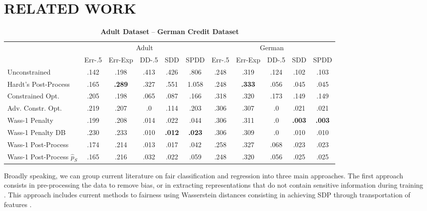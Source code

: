 \documentclass[letterpaper]{article}
\newcommand\boldblue[1]{\textcolor{lowblue}{\textbf{#1}}}
\newcommand\boldred[1]{\textcolor{lowred}{\textbf{#1}}}
\theoremstyle{definition}
\begin{document}
\section{RELATED WORK}
\vskip-0.2cm
\begin{table}
\setlength{\tabcolsep}{5pt}
\caption{{\bf Adult Dataset} -- {\bf German Credit Dataset}}
\begin{center}
\begin{tabular}{lccccc|ccccc}
&\multicolumn{5}{c}{Adult}&\multicolumn{5}{c}{German}\\
\cline{2-6}\cline{7-11}
& Err-.5 & Err-Exp & DD-.5 & SDD & SPDD & Err-.5 & Err-Exp & DD-.5 & SDD  & SPDD\\
\toprule
Unconstrained        & .142 & .198 & .413 & .426 & .806 &.248 & .319 & .124 & .102 & .103\\
Hardt's Post-Process & .165 & \boldred{.289} & .327 & .551 &1.058 & .248 & \boldred{.333} & .056 & .045 & .045\\
Constrained Opt.     & .205 & .198 & .065 & .087 & .166 & .318 & .320 & .173 & .149 & .149\\
Adv. Constr. Opt.    & .219 & .207 & .0   & .114 & .203 & .306 & .307 & .0   & .021 & .021\\
Wass-1 Penalty       & .199 & .208 & .014 & .022 & .044 & .306 & .311 & .0   & \boldblue{.003} & \boldblue{.003}\\
Wass-1 Penalty DB    & .230 & .233 & .010 & \boldblue{.012} & \boldblue{.023} & .306 & .309 & .0   & .010 & .010\\
Wass-1 Post-Process  &.174 & .214 & .013 & .017 & .042 & .258 & .327 & .068 & .023 & .023\\
Wass-1 Post-Process $\hat p_{S}$  & .165 & .216 & .032 & .022 & .059 & .248 & .320 & .056 & .025 & .025\\
\bottomrule
\end{tabular}
\end{center}
\label{table:Adult&German}
\end{table}
Broadly speaking, we can group current literature on fair classification and regression into three main approaches. The first approach consists in pre-processing the data to remove bias, or in extracting representations that do not contain sensitive information during training \citep{beutel17data,calders09building,calmon17optimized,edwards16censoring,feldman15certifying,fish15fair,kamiran09classifying,kamiran12data,louizos16fair,zemel13learning,vzliobaite11handling}. 
This approach includes current methods to fairness using Wasserstein distances consisting in achieving SDP through transportation of features \citep{delbarrio18obtaining,johndrow19algorithm}.
\end{document}
